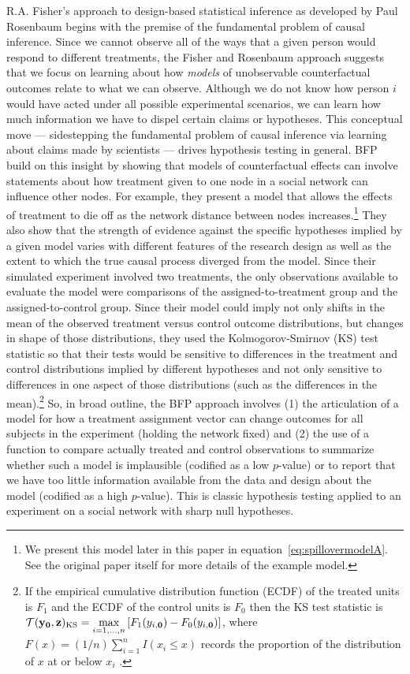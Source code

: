 R.A. Fisher's approach to design-based statistical inference  \citep[Chap
2]{fisher:1935} as developed by Paul Rosenbaum  \citep{rosenbaum2010design}
begins with the premise of the fundamental problem of causal inference. Since
we cannot observe all of the ways that a given person would respond to
different treatments, the Fisher and Rosenbaum approach
suggests that we focus on learning about how \emph{models} of unobservable
counterfactual outcomes relate to what we can observe. Although we do not know
how person $i$ would have acted under all possible experimental scenarios, we
can learn how much information we have to dispel certain claims or hypotheses.
This conceptual move --- sidestepping the fundamental problem of causal
inference via learning about claims made by scientists --- drives hypothesis
testing in general.  BFP build on this insight by showing that models of
counterfactual effects can involve statements about how treatment given to one
node in a social network can influence other nodes. For example, they present
a model that allows the effects of treatment to die off as the network
distance between nodes increases.\footnote{We present this model later in this
  paper in equation~\ref{eq:spillovermodelA}. See the original paper itself for more
  details of the example model.} They also show that the strength of evidence
against the specific hypotheses implied by a given model varies with different
features of the research design as well as the extent to which the true causal
process diverged from the model. Since their simulated experiment involved two
treatments, the only observations available to evaluate the model were
comparisons of the assigned-to-treatment group and the assigned-to-control
group. Since their model could imply not only shifts in the mean of the
observed treatment versus control outcome distributions, but changes in shape
of those distributions, they used the Kolmogorov-Smirnov (KS) test statistic
so that their tests would be sensitive to differences in the treatment and
control distributions implied by different hypotheses and not only sensitive
to differences in one aspect of those distributions (such as the differences
in the mean).\footnote{If the empirical cumulative distribution function
  (ECDF) of the treated units is $F_1$ and the ECDF of the control units is
  $F_0$ then the KS test statistic is $\mathcal{T}(\mathbf{y}_{\mathbf{0}},\mathbf{z})_{\text{KS}} = \underset{i =
    1,\ldots,n}{\text{max}}\left[F_1(y_{i,\mathbf{0}}) -
    F_0(y_{i,\mathbf{0}})\right]$, where $F(x)=(1/n)\sum_{i=1}^n I(x_i \le x)$
  records the proportion of the distribution of $x$ at or below $x_i$
  \citep[\S 5.4]{MylesHollander1999a}.\label{fn:kstest}} So, in broad
outline, the BFP approach involves (1) the articulation of a model for how a
treatment assignment vector can change outcomes for all subjects in the
experiment (holding the network fixed) and (2) the use of a function to
compare actually treated and control observations to summarize whether such a model is
implausible (codified as a low $p$-value)  or to report that we have too little
information available from the data and design about the model (codified as a
high $p$-value). This is classic hypothesis testing applied to an experiment
on a social network with sharp null hypotheses.


